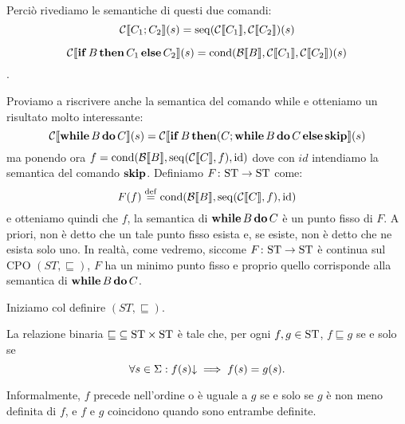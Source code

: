 Perciò rivediamo le semantiche di questi due comandi:
$$ \mathcal{C} \llbracket C_1 ; C_2 \rrbracket (s) = \mathrm{seq}(\mathcal{C} \llbracket C_1 \rrbracket, \mathcal{C} \llbracket C_2 \rrbracket)(s)$$

$$\mathcal{C} \llbracket \mathop{\textup{\textbf{if}}} B \mathop{\textup{\textbf{then}}} C_1 \mathop{\textup{\textbf{else}}} C_2 \rrbracket (s) = \mathrm{cond}(\mathcal{B} \llbracket B \rrbracket, \mathcal{C} \llbracket C_1 \rrbracket, \mathcal{C} \llbracket C_2 \rrbracket)(s)$$.

Proviamo a riscrivere anche la semantica del comando while e otteniamo un risultato molto interessante:
$$ \mathcal{C} \llbracket \mathop{\textup{\textbf{while}}} B \mathop{\textup{\textbf{do}}} C \rrbracket (s) = \mathcal{C} \llbracket \mathop{\textup{\textbf{if}}} B \mathop{\textup{\textbf{then}}} (C ; \mathop{\textup{\textbf{while}}} B \mathop{\textup{\textbf{do}}} C \mathop{\textup{\textbf{else}}} \mathop{\textup{\textbf{skip}}} \rrbracket (s)$$
ma ponendo ora $f = \mathrm{cond}(\mathcal{B} \llbracket B \rrbracket, \mathrm{seq}(\mathcal{C} \llbracket C \rrbracket, f), \mathrm{id})$ dove con $id$ intendiamo la semantica del comando $\mathop{\textup{\textbf{skip}}}$.
Definiamo $\mathord{F}\colon\mathrm{ST}\to\mathrm{ST}$ come:
\[
F(f) \defeq \mathrm{cond}(\calB \llbracket B \rrbracket, \mathrm{seq}(\calC \llbracket C \rrbracket, f), \mathrm{id})
\]
e otteniamo quindi che $f$, la semantica di $\mathop{\textup{\textbf{while}}} B \mathop{\textup{\textbf{do}}} C$ è un punto fisso
di $F$.
A priori, non \`e detto che un tale punto fisso esista e, se esiste,
non \`e detto che ne esista solo uno.
In realt\`a, come vedremo, siccome $\mathord{F}\colon\mathrm{ST}\to\mathrm{ST}$ \`e continua
sul CPO $(ST, \sqsubseteq)$, $F$ ha un minimo punto fisso e proprio
quello corrisponde alla semantica di $\mathop{\textup{\textbf{while}}} B \mathop{\textup{\textbf{do}}} C$.

Iniziamo col definire $(ST, \sqsubseteq)$.

\begin{definizione} 
La relazione binaria $\mathord{\sqsubseteq}\subseteq\mathrm{ST}\times\mathrm{ST}$ \`e tale che,
per ogni $f, g \in \mathrm{ST}$,  $f \sqsubseteq g$ se e solo se
\[
  \forall s \in \Sigma \mathrel{:} f(s)\mathord{\downarrow} \implies f(s) = g(s).
\]
\end{definizione}
Informalmente, $f$ precede nell'ordine o \`e uguale a $g$ se e solo se
$g$ è non meno definita di $f$, e $f$ e $g$ coincidono quando sono entrambe
definite.

